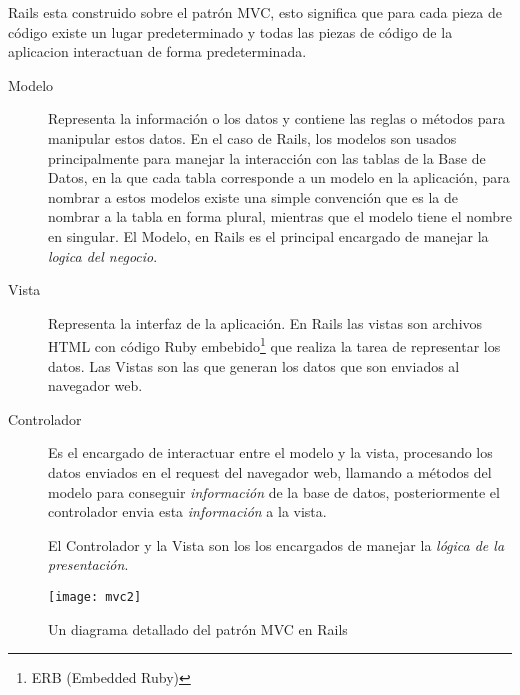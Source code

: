       Rails esta construido sobre el patr\'on MVC, esto significa que para cada
      pieza de código existe un lugar predeterminado y todas las piezas de código
      de la aplicacion interactuan de forma predeterminada. 
      \begin{description}
        \item[Modelo] Representa la informaci\'on o los datos y contiene 
        las reglas o métodos para manipular estos datos. En el caso de Rails, los
        modelos son usados principalmente para manejar la interacci\'on con las 
        tablas de la Base de Datos, en la que cada tabla corresponde a un modelo 
        en la aplicaci\'on, para nombrar a estos modelos existe una simple convenci\'on 
        que es la de nombrar  a la tabla en forma plural, mientras que el modelo 
        tiene el nombre en singular.
        El Modelo, en Rails es el principal encargado de manejar  la \emph{logica del negocio}.
        \item[Vista]  Representa la interfaz de la aplicaci\'on. En Rails las vistas 
        son archivos HTML con código Ruby embebido\footnote{ ERB (Embedded Ruby) } que realiza la tarea de representar 
        los datos. Las Vistas son las que generan los datos que son enviados al
        navegador web.%
        \item[Controlador] Es el encargado de interactuar entre el modelo y la vista,
        procesando los datos enviados en el request del navegador web, 
        llamando a métodos del modelo para conseguir  \emph{informaci\'on} de la base de datos,
        posteriormente el controlador envia esta \emph{informaci\'on}  a la vista.

        El Controlador y la Vista son los los encargados de manejar  la \emph{l\'ogica de la presentaci\'on}.
      \end{description}


      \begin{figure}[!hbp]
        \begin{center}
          \texttt{[image: mvc2]}
        \end{center}
        \caption{Un diagrama detallado del patr\'on MVC en Rails}
        \label{fig:mvc}
      \end{figure}



